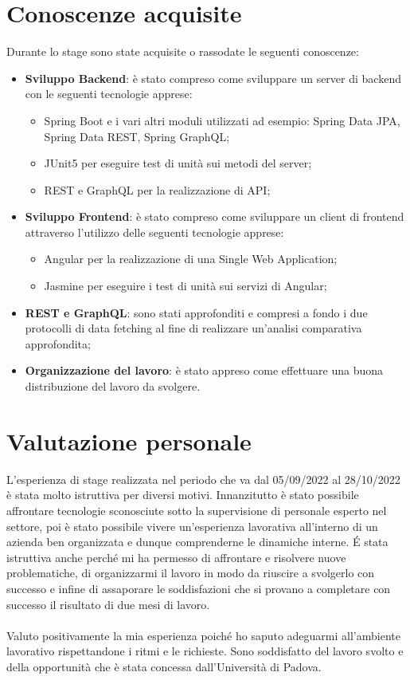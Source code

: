 \section{Conoscenze acquisite}
Durante lo stage sono state acquisite o rassodate le seguenti conoscenze:
\begin{itemize}
  \item \textbf{Sviluppo Backend}: è stato compreso come sviluppare un server di backend con le seguenti tecnologie apprese:
  \begin{itemize}
    \item Spring Boot e i vari altri moduli utilizzati ad esempio: Spring Data JPA, Spring Data REST, Spring GraphQL;
    \item JUnit5 per eseguire test di unità sui metodi del server;
    \item REST e GraphQL per la realizzazione di API;
  \end{itemize}
  \item \textbf{Sviluppo Frontend}: è stato compreso come sviluppare un client di frontend attraverso l'utilizzo delle seguenti tecnologie apprese:
  \begin{itemize}
    \item Angular per la realizzazione di una Single Web Application;
    \item Jasmine per eseguire i test di unità sui servizi di Angular;
  \end{itemize}
  \item \textbf{REST e GraphQL}: sono stati approfonditi e compresi a fondo i due protocolli di data fetching al fine di realizzare un'analisi comparativa approfondita;
  \item \textbf{Organizzazione del lavoro}: è stato appreso come effettuare una buona distribuzione del lavoro da svolgere.
\end{itemize}
\section{Valutazione personale}
L'esperienza di stage realizzata nel periodo che va dal 05/09/2022 al 28/10/2022 è stata molto istruttiva per diversi motivi. Innanzitutto è stato possibile affrontare tecnologie sconosciute sotto la supervisione di personale esperto nel settore, poi è stato possibile vivere un'esperienza lavorativa all'interno di un azienda ben organizzata e dunque comprenderne le dinamiche interne. É stata istruttiva anche perché mi ha permesso di affrontare e risolvere nuove problematiche, di organizzarmi il lavoro in modo da riuscire a svolgerlo con successo e infine di assaporare le soddisfazioni che si provano a completare con successo il risultato di due mesi di lavoro.\\ \\
Valuto positivamente la mia esperienza poiché ho saputo adeguarmi all'ambiente lavorativo rispettandone i ritmi e le richieste. Sono soddisfatto del lavoro svolto e della opportunità che è stata concessa dall'Università di Padova.
